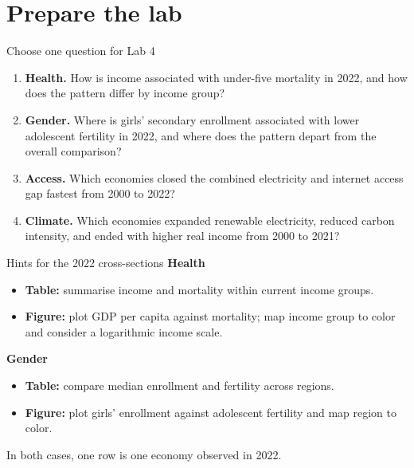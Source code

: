 \section{Prepare the lab}

\begin{frame}{Choose one question for Lab 4}
\small
\begin{enumerate}
\item \textbf{Health.} How is income associated with under-five mortality in 2022, and how does the pattern differ by income group?
\item \textbf{Gender.} Where is girls' secondary enrollment associated with lower adolescent fertility in 2022, and where does the pattern depart from the overall comparison?
\item \textbf{Access.} Which economies closed the combined electricity and internet access gap fastest from 2000 to 2022?
\item \textbf{Climate.} Which economies expanded renewable electricity, reduced carbon intensity, and ended with higher real income from 2000 to 2021?
\end{enumerate}
\end{frame}

\begin{frame}{Hints for the 2022 cross-sections}
\textbf{Health}
\begin{itemize}
\item \textbf{Table:} summarise income and mortality within current income groups.
\item \textbf{Figure:} plot GDP per capita against mortality; map income group to color and consider a logarithmic income scale.
\end{itemize}
\vspace{0.3cm}
\textbf{Gender}
\begin{itemize}
\item \textbf{Table:} compare median enrollment and fertility across regions.
\item \textbf{Figure:} plot girls' enrollment against adolescent fertility and map region to color.
\end{itemize}
\vspace{0.25cm}
In both cases, one row is one economy observed in 2022.
\end{frame}

